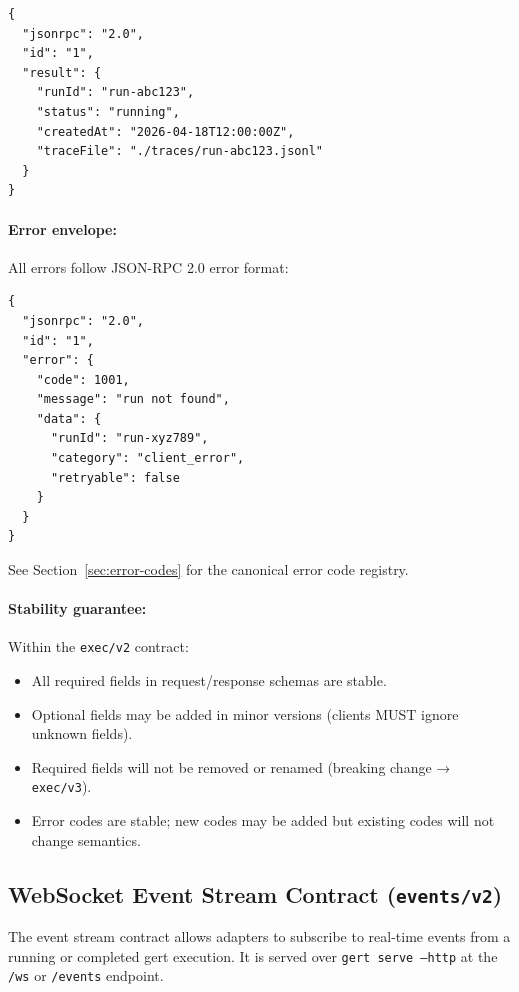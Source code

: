 \begin{verbatim}
{
  "jsonrpc": "2.0",
  "id": "1",
  "result": {
    "runId": "run-abc123",
    "status": "running",
    "createdAt": "2026-04-18T12:00:00Z",
    "traceFile": "./traces/run-abc123.jsonl"
  }
}
\end{verbatim}

\paragraph{Error envelope:}

All errors follow JSON-RPC 2.0 error format:

\begin{verbatim}
{
  "jsonrpc": "2.0",
  "id": "1",
  "error": {
    "code": 1001,
    "message": "run not found",
    "data": {
      "runId": "run-xyz789",
      "category": "client_error",
      "retryable": false
    }
  }
}
\end{verbatim}

See Section~\ref{sec:error-codes} for the canonical error code registry.

\paragraph{Stability guarantee:}

Within the \texttt{exec/v2} contract:

\begin{itemize}
  \item All required fields in request/response schemas are stable.
  \item Optional fields may be added in minor versions (clients MUST ignore
        unknown fields).
  \item Required fields will not be removed or renamed (breaking change →
        \texttt{exec/v3}).
  \item Error codes are stable; new codes may be added but existing codes will
        not change semantics.
\end{itemize}

\subsection{WebSocket Event Stream Contract (\texttt{events/v2})}
\label{sec:ws-event-contract}

The event stream contract allows adapters to subscribe to real-time events from
a running or completed gert execution.  It is served over \texttt{gert serve
--http} at the \texttt{/ws} or \texttt{/events} endpoint.

